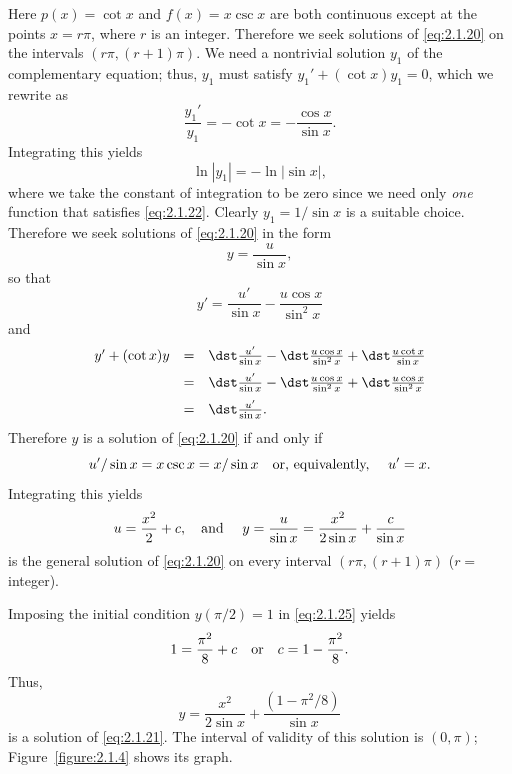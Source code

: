 \begin{examplesolution}
 Here $p(x)=\cot x$ and $f(x)=x\csc x$ are both continuous except at the points
$x=r\pi$, where $r$ is an integer. Therefore we seek solutions of \eqref{eq:2.1.20} on the intervals
$\left(r\pi,(r+1)\pi\right)$. We need a nontrivial solution $y_{1}$ of the complementary equation;
thus, $y_{1}$ must satisfy $y_{1}'+(\cot x)y_{1}=0$, which we rewrite as
\begin{equation}
  \label{eq:2.1.22}\frac{y_{1}'}{y_{1}}=-\cot x=-\frac{\cos x}{\sin x}.
\end{equation}
Integrating this yields
\[
  \ln|y_{1}|=-\ln|\sin x|,
\]
where we take the constant of integration to be zero since we need only {\relax\it one\/}
function that satisfies \eqref{eq:2.1.22}. Clearly $y_{1}=1/\sin x$ is a suitable choice. Therefore
we seek solutions of \eqref{eq:2.1.20} in the form
\[
  y=\frac{u}{\sin x},
\]
so that
\begin{equation}
  \label{eq:2.1.23}y'=\frac{u'}{\sin x}-\frac{u\cos x}{\sin^{2}x}
\end{equation}
and
\begin{equation}
  \label{eq:2.1.24}
  \begin{array}{rcl}
    y'+(\cot x)y & = & \dst\frac{u'}{\sin x}-\dst\frac{u\cos x}{\sin^{2}x}+\dst\frac{u\cot x}{\sin x}    \\[2\jot]
                 & = & \dst\frac{u'}{\sin x}-\dst\frac{u\cos x}{\sin^{2}x}+\dst\frac{u\cos x}{\sin^{2}x} \\[2\jot]
                 & = & \dst\frac{u'}{\sin x}.
  \end{array}
\end{equation}
Therefore $y$ is a solution of \eqref{eq:2.1.20} if and only if
\[
  u'/\sin x=x\csc x=x/\sin x\mbox{\quad or, equivalently, \quad}u'=x.
\]
Integrating this yields
\begin{equation}
  \label{eq:2.1.25}u=\frac{x^{2}}{2}+c,\text{\quad and \quad }y=\frac{u}{\sin x}=\frac{x^{2}}{2\sin x}+\frac{c}{\sin x}
\end{equation}
is the general solution of \eqref{eq:2.1.20} on every interval $\left(r\pi,(r+1)\pi\right)$
($r=$integer).

 Imposing the initial condition $y(\pi/2)=1$ in \eqref{eq:2.1.25} yields
\[
  1=\frac{\pi^{2}}{8}+c\mbox{\quad or\quad}c=1-\frac{\pi^{2}}{8}.
\]
Thus,
\[
  y=\frac{x^{2}}{2\sin x}+\frac{(1-\pi^{2}/8)}{\sin x}
\]
is a solution of \eqref{eq:2.1.21}. The interval of validity of this solution is $(0,\pi)$;
Figure~\ref{figure:2.1.4} shows its graph.


\end{examplesolution}
